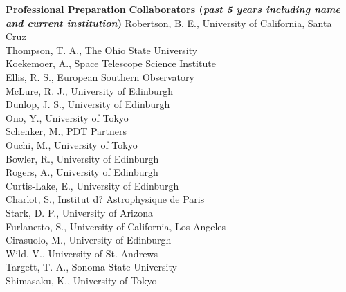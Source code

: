 \documentclass[11pt,letterpaper,english]{article}
\begin{document}
\begin{flushleft} {\bf Professional Preparation}
\vspace{-6pt}
{\bf Collaborators ({\emph{past 5 years including name and current institution}})} 
{\parindent 16pt
Robertson, B. E., University of California, Santa Cruz \\
Thompson, T. A., The Ohio State University \\
Koekemoer, A., Space Telescope Science Institute \\
Ellis, R. S., European Southern Observatory \\
McLure, R. J., University of Edinburgh \\
Dunlop, J. S., University of Edinburgh \\
Ono, Y., University of Tokyo \\
Schenker, M., PDT Partners \\
Ouchi, M., University of Tokyo \\
Bowler, R., University of Edinburgh \\
Rogers, A., University of Edinburgh \\
Curtis-Lake, E., University of Edinburgh \\
Charlot, S., Institut d? Astrophysique de Paris \\
Stark, D. P., University of Arizona \\
Furlanetto, S., University of California, Los Angeles \\
Cirasuolo, M., University of Edinburgh \\
Wild, V., University of St. Andrews \\
Targett, T. A., Sonoma State University \\
Shimasaku, K., University of Tokyo \\
}


\end{flushleft}
\end{document}
